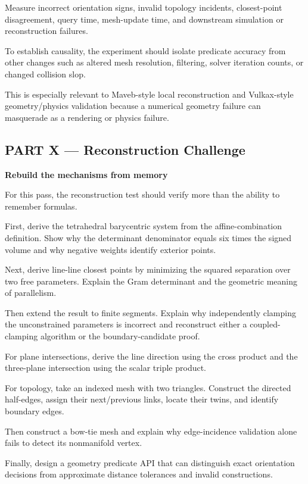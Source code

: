 Measure incorrect orientation signs, invalid topology incidents, closest-point disagreement, query time, mesh-update time, and downstream simulation or reconstruction failures.

To establish causality, the experiment should isolate predicate accuracy from other changes such as altered mesh resolution, filtering, solver iteration counts, or changed collision slop.

This is especially relevant to Maveb-style local reconstruction and Vulkax-style geometry/physics validation because a numerical geometry failure can masquerade as a rendering or physics failure.

\subsection{PART X --- Reconstruction Challenge}\label{04-visual-computing-ii-ch023-part-x-reconstruction-challenge}

\textbf{Rebuild the mechanisms from memory}

For this pass, the reconstruction test should verify more than the ability to remember formulas.

First, derive the tetrahedral barycentric system from the affine-combination definition. Show why the determinant denominator equals six times the signed volume and why negative weights identify exterior points.

Next, derive line-line closest points by minimizing the squared separation over two free parameters. Explain the Gram determinant and the geometric meaning of parallelism.

Then extend the result to finite segments. Explain why independently clamping the unconstrained parameters is incorrect and reconstruct either a coupled-clamping algorithm or the boundary-candidate proof.

For plane intersections, derive the line direction using the cross product and the three-plane intersection using the scalar triple product.

For topology, take an indexed mesh with two triangles. Construct the directed half-edges, assign their next/previous links, locate their twins, and identify boundary edges.

Then construct a bow-tie mesh and explain why edge-incidence validation alone fails to detect its nonmanifold vertex.

Finally, design a geometry predicate API that can distinguish exact orientation decisions from approximate distance tolerances and invalid constructions.

